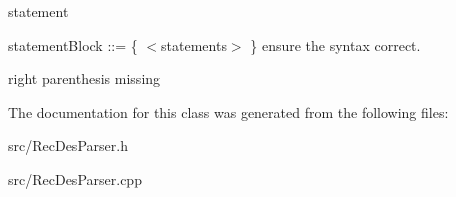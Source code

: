 statement 

statement\+Block \+:\+:= \textquotesingle{}\{\textquotesingle{} $<$statements$>$ \textquotesingle{}\}\textquotesingle{} ensure the syntax correct.

right parenthesis missing 

The documentation for this class was generated from the following files\+:\begin{DoxyCompactItemize}
\item 
src/Rec\+Des\+Parser.\+h\item 
src/Rec\+Des\+Parser.\+cpp\end{DoxyCompactItemize}
